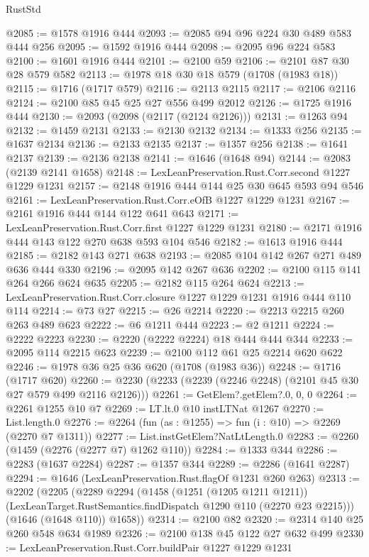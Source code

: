 \begin{lexlean}{RustStd}
\begin{coremodule}
@2085 := @1578 @1916 @444
@2093 := @2085 @94 @96 @224 @30 @489 @583 @444 @256
@2095 := @1592 @1916 @444
@2098 := @2095 @96 @224 @583
@2100 := @1601 @1916 @444
@2101 := @2100 @59
@2106 := @2101 @87 @30 @28 @579 @582
@2113 := @1978 @18 @30 @18 @579 (@1708 (@1983 @18))
@2115 := @1716 (@1717 @579)
@2116 := @2113 @2115
@2117 := @2106 @2116
@2124 := @2100 @85 @45 @25 @27 @556 @499 @2012
@2126 := @1725 @1916 @444
@2130 := @2093 (@2098 (@2117 (@2124 @2126)))
@2131 := @1263 @94
@2132 := @1459 @2131
@2133 := @2130 @2132
@2134 := @1333 @256
@2135 := @1637 @2134
@2136 := @2133 @2135
@2137 := @1357 @256
@2138 := @1641 @2137
@2139 := @2136 @2138
@2141 := @1646 (@1648 @94)
@2144 := @2083 (@2139 @2141 @1658)
@2148 := LexLeanPreservation.Rust.Corr.second @1227 @1229 @1231
@2157 := @2148 @1916 @444 @144 @25 @30 @645 @593 @94 @546
@2161 := LexLeanPreservation.Rust.Corr.eOfB @1227 @1229 @1231
@2167 := @2161 @1916 @444 @144 @122 @641 @643
@2171 := LexLeanPreservation.Rust.Corr.first @1227 @1229 @1231
@2180 := @2171 @1916 @444 @143 @122 @270 @638 @593 @104 @546
@2182 := @1613 @1916 @444
@2185 := @2182 @143 @271 @638
@2193 := @2085 @104 @142 @267 @271 @489 @636 @444 @330
@2196 := @2095 @142 @267 @636
@2202 := @2100 @115 @141 @264 @266 @624 @635
@2205 := @2182 @115 @264 @624
@2213 := LexLeanPreservation.Rust.Corr.closure @1227 @1229 @1231 @1916 @444 @110 @114
@2214 := @73 @27
@2215 := @26 @2214
@2220 := @2213 @2215 @260 @263 @489 @623
@2222 := @6 @1211 @444
@2223 := @2 @1211
@2224 := @2222 @2223
@2230 := @2220 (@2222 @2224) @18 @444 @444 @344
@2233 := @2095 @114 @2215 @623
@2239 := @2100 @112 @61 @25 @2214 @620 @622
@2246 := @1978 @36 @25 @36 @620 (@1708 (@1983 @36))
@2248 := @1716 (@1717 @620)
@2260 := @2230 (@2233 (@2239 (@2246 @2248) (@2101 @45 @30 @27 @579 @499 @2116 @2126)))
@2261 := GetElem?.getElem?.{0, 0, 0}
@2264 := @2261 @1255 @10 @7
@2269 := LT.lt.{0} @10 instLTNat @1267
@2270 := List.length.{0}
@2276 := @2264 (fun (as : @1255) => fun (i : @10) => @2269 (@2270 @7 @1311))
@2277 := List.instGetElem?NatLtLength.{0}
@2283 := @2260 (@1459 (@2276 (@2277 @7) @1262 @110))
@2284 := @1333 @344
@2286 := @2283 (@1637 @2284)
@2287 := @1357 @344
@2289 := @2286 (@1641 @2287)
@2294 := @1646 (LexLeanPreservation.Rust.flagOf @1231 @260 @263)
@2313 := @2202
    (@2205
      (@2289
        @2294
        (@1458
          (@1251 (@1205 @1211 @1211))
          (LexLeanTarget.RustSemantics.findDispatch @1290 @110 (@2270 @23 @2215)))
        (@1646 (@1648 @110))
        @1658))
@2314 := @2100 @82
@2320 := @2314 @140 @25 @260 @548 @634 @1989
@2326 := @2100 @138 @45 @122 @27 @632 @499
@2330 := LexLeanPreservation.Rust.Corr.buildPair @1227 @1229 @1231

\end{coremodule}
\end{lexlean}
